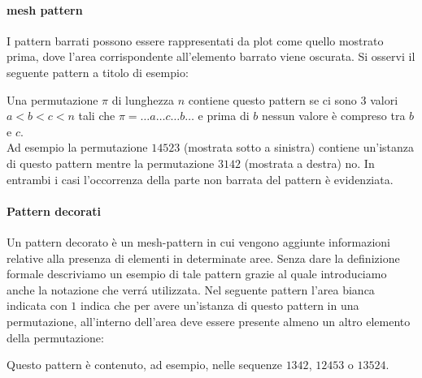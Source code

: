 \paragraph*{mesh pattern} I pattern barrati possono essere rappresentati da plot come quello mostrato prima, dove l'area corrispondente all'elemento barrato viene oscurata. Si osservi il seguente pattern a titolo di esempio:
\begin{center}\end{center}
Una permutazione $\pi$ di lunghezza $n$ contiene questo pattern se ci sono 3 valori $a<b<c<n$ tali che $\pi=\dots{a}\dots{c}\dots{b}\dots$ e prima di $b$ nessun valore \`e compreso tra $b$ e $c$.\\
Ad esempio la permutazione $14523$ (mostrata sotto a sinistra) contiene un'istanza di questo pattern mentre la permutazione $3142$ (mostrata a destra) no. In entrambi i casi l'occorrenza della parte non barrata del pattern \`e evidenziata.
\begin{center}
\end{center}
\paragraph*{Pattern decorati}Un pattern decorato \`e un mesh-pattern in cui vengono aggiunte informazioni relative alla presenza di elementi in determinate aree. Senza dare la definizione formale descriviamo un esempio di tale pattern grazie al quale introduciamo anche la notazione che verr\'a utilizzata. Nel seguente pattern l'area bianca indicata con $1$ indica che per avere un'istanza di questo pattern in una permutazione, all'interno dell'area deve essere presente almeno un altro elemento della permutazione: 
\begin{center}
\end{center}
Questo pattern \`e contenuto, ad esempio, nelle sequenze $1342$, $12453$ o $13524$.
